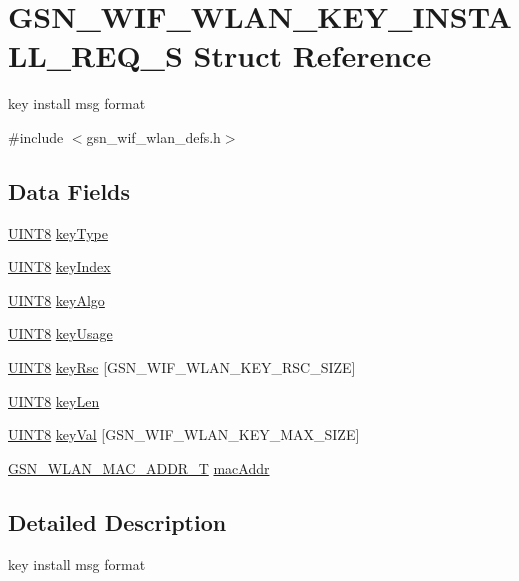 \hypertarget{a00386}{
\section{GSN\_\-WIF\_\-WLAN\_\-KEY\_\-INSTALL\_\-REQ\_\-S Struct Reference}
\label{a00386}
}


key install msg format  




{\ttfamily \#include $<$gsn\_\-wif\_\-wlan\_\-defs.h$>$}

\subsection*{Data Fields}
\begin{DoxyCompactItemize}
\item 
\hyperlink{a00660_gab27e9918b538ce9d8ca692479b375b6a}{UINT8} \hyperlink{a00386_aebf6381de07ce9af9d9fa581ce41c05e}{keyType}
\item 
\hyperlink{a00660_gab27e9918b538ce9d8ca692479b375b6a}{UINT8} \hyperlink{a00386_afcf93136bff6ef3037dec249b48d1eba}{keyIndex}
\item 
\hyperlink{a00660_gab27e9918b538ce9d8ca692479b375b6a}{UINT8} \hyperlink{a00386_a53fe92daed71e812f41e8b404d4da106}{keyAlgo}
\item 
\hyperlink{a00660_gab27e9918b538ce9d8ca692479b375b6a}{UINT8} \hyperlink{a00386_ad2cde845408f2d2b0237ffb73e9e5a73}{keyUsage}
\item 
\hyperlink{a00660_gab27e9918b538ce9d8ca692479b375b6a}{UINT8} \hyperlink{a00386_a2eafab72acba3788c4a792fb72c37a34}{keyRsc} \mbox{[}GSN\_\-WIF\_\-WLAN\_\-KEY\_\-RSC\_\-SIZE\mbox{]}
\item 
\hyperlink{a00660_gab27e9918b538ce9d8ca692479b375b6a}{UINT8} \hyperlink{a00386_a19c67de3f96782516f1c496a77e01074}{keyLen}
\item 
\hyperlink{a00660_gab27e9918b538ce9d8ca692479b375b6a}{UINT8} \hyperlink{a00386_a2326484148e2be0bd762aa571f9e5ef6}{keyVal} \mbox{[}GSN\_\-WIF\_\-WLAN\_\-KEY\_\-MAX\_\-SIZE\mbox{]}
\item 
\hyperlink{a00416}{GSN\_\-WLAN\_\-MAC\_\-ADDR\_\-T} \hyperlink{a00386_ab623c15c7dc79be51bcdaa04fba67d90}{macAddr}
\end{DoxyCompactItemize}


\subsection{Detailed Description}
key install msg format 

